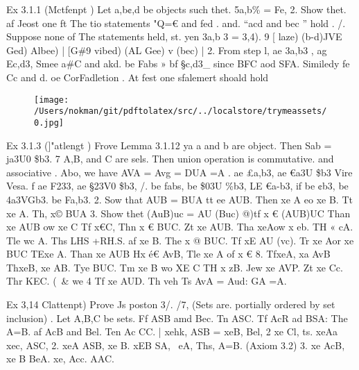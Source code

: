 \documentclass[a4paper,12pt]{article}
\begin{document}
    Ex 3.1.1 (Mctfenpt )  Let a,b¢,d be objects such thet. 5a,b\% = Fe, 2.    Show thet. af Jeost one ft The tio statements "Q=€ and fed .  and. “acd and bec ” hold .    /. Suppose none of The statements held, st. yen 3a,b 3 = 3,4).  9 [ laze) (b-d)JVE Ged) Albee) |  [G\#9 vibed) (AL Gee) v (bec) |  2. From step l, ae 3a,b3 , ag Ec,d3, Smee a\#C and akd.  be Fabs » bf §c,d3\_ since BFC aod SFA.  Similedy fe Cc and d. oe CorFadletion .    At fest one sfalemert shoald hold 

\vspace{10pt}

\par

\vspace{10pt}

\begin{figure}[h]

\texttt{[image: /Users/nokman/git/pdftolatex/src/../localstore/trymeassets/0.jpg]}

\centering

\end{figure}

\par

\vspace{10pt}

    Ex 3.1.3 (]"atlengt )   Frove Lemma 3.1.12   ya a and b are object. Then Sab = ja3U0 \$b3.   7 A,B, and C are sels. Then union operation is commutative. and associative .  Abo, we have AVA = Avg = DUA =A .    ae £a,b3, ae €a3U \$b3 Vire Vesa. f ae F233, ae §23V0 \$b3,    /.  be fabs, be \$03U \%b3, LE €a-b3,  if be ¢b3, be 4a3VGb3.  be Fa,b3.  2. Sow that AUB = BUA  tt ee AUB. Then xe A eo xe B.  Tt xe A. Th, x© BUA  3. Show thet (AuB)uc = AU (Buc)  @)tf x € (AUB)UC Than xe AUB ow xe C  Tf x€C, Thn x € BUC.  Zt xe AUB. Tha xeAow x eb.  TH « cA. Tle wc A. Ths  LHS +RH.S.    af xe B. The x @ BUC.   Tf xE AU (vc). Tr xe Aor xe BUC  TExe A. Than xe AUB   Hx é€ AvB, Tle xe A of x € 8.  TfxeA, xa AvB   ThxeB, xe AB.   Tye BUC. Tm xe B wo XE C   TH x zB. Jew xe AVP.   Zt xe Cc. Thr KEC.    (~\&    we    4 Tf xe AUD. Th veh Ts AvA = Aud: GA =A. 

\vspace{10pt}

\par

\vspace{10pt}

    Ex 3,14 Clattenpt)   Prove Js poston 3/. /7, (Sets are. portially ordered by set inclusion) .  Let A,B,C be sets. Ff ASB amd Bec. Tn ASC.   Tf AcR ad BSA: The A=B.   af AcB and Bel. Ten Ac CC.    | xehk, ASB = xeB,  Bel, 2 xe Cl, ts. xeAa xec, ASC,    2. xeA ASB, xe B.  xEB SA, ~eA, Ths, A=B. (Axiom 3.2)    3. xe AcB, xe B  BeA. xe, Acc. AAC. 
\end{document}
